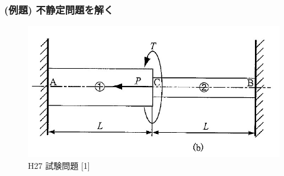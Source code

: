 \documentclass[a4paper]{jsarticle}
\begin{document}
\subsubsection{(例題) 不静定問題を解く}
\begin{figure}[htbp]
    \begin{center}
        \includegraphics[width=120mm]{images/zairiki_image3.jpg}
        \caption{H27 試験問題 [1]}
    \end{center}
\end{figure}
\end{document}
